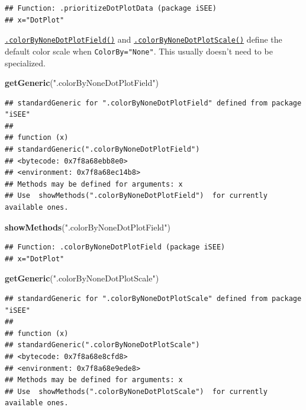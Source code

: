 \documentclass[
]{book}
\newenvironment{Shaded}{\begin{snugshade}}{\end{snugshade}}
\newcommand{\KeywordTok}[1]{\textcolor[rgb]{0.13,0.29,0.53}{\textbf{#1}}}
\newcommand{\NormalTok}[1]{#1}
\newcommand{\StringTok}[1]{\textcolor[rgb]{0.31,0.60,0.02}{#1}}
\begin{document}
\begin{verbatim}
## Function: .prioritizeDotPlotData (package iSEE)
## x="DotPlot"
\end{verbatim}

\href{https://isee.github.io/iSEE/reference/plot-generics.html}{\texttt{.colorByNoneDotPlotField()}} and \href{https://isee.github.io/iSEE/reference/plot-generics.html}{\texttt{.colorByNoneDotPlotScale()}} define the default color scale when \texttt{ColorBy="None"}.
This usually doesn't need to be specialized.

\begin{Shaded}
\begin{Highlighting}[]
\KeywordTok{getGeneric}\NormalTok{(}\StringTok{".colorByNoneDotPlotField"}\NormalTok{)}
\end{Highlighting}
\end{Shaded}

\begin{verbatim}
## standardGeneric for ".colorByNoneDotPlotField" defined from package "iSEE"
## 
## function (x) 
## standardGeneric(".colorByNoneDotPlotField")
## <bytecode: 0x7f8a68ebb8e0>
## <environment: 0x7f8a68ec14b8>
## Methods may be defined for arguments: x
## Use  showMethods(".colorByNoneDotPlotField")  for currently available ones.
\end{verbatim}

\begin{Shaded}
\begin{Highlighting}[]
\KeywordTok{showMethods}\NormalTok{(}\StringTok{".colorByNoneDotPlotField"}\NormalTok{)}
\end{Highlighting}
\end{Shaded}

\begin{verbatim}
## Function: .colorByNoneDotPlotField (package iSEE)
## x="DotPlot"
\end{verbatim}

\begin{Shaded}
\begin{Highlighting}[]
\KeywordTok{getGeneric}\NormalTok{(}\StringTok{".colorByNoneDotPlotScale"}\NormalTok{)}
\end{Highlighting}
\end{Shaded}

\begin{verbatim}
## standardGeneric for ".colorByNoneDotPlotScale" defined from package "iSEE"
## 
## function (x) 
## standardGeneric(".colorByNoneDotPlotScale")
## <bytecode: 0x7f8a68e8cfd8>
## <environment: 0x7f8a68e9ede8>
## Methods may be defined for arguments: x
## Use  showMethods(".colorByNoneDotPlotScale")  for currently available ones.
\end{verbatim}
\end{document}
